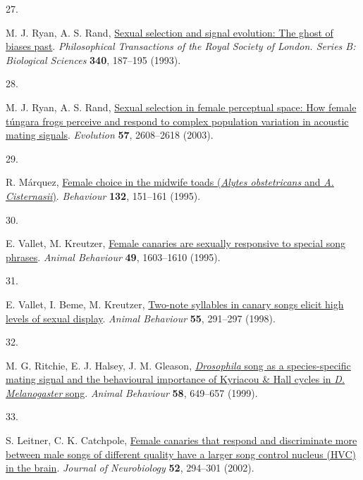 \documentclass[
]{article}
\newlength{\cslhangindent}
\newlength{\csllabelwidth}
\newenvironment{CSLReferences}[2] %
 {\begin{list}{}{%
  \setlength{\itemindent}{0pt}
  \setlength{\leftmargin}{0pt}
  \setlength{\parsep}{0pt}
  \ifodd #1
   \setlength{\leftmargin}{\cslhangindent}
   \setlength{\itemindent}{-1\cslhangindent}
  \fi
  \setlength{\itemsep}{#2\baselineskip}}}
 {\end{list}}
\newcommand{\CSLLeftMargin}[1]{\parbox[t]{\csllabelwidth}{\strut#1\strut}}
\newcommand{\CSLRightInline}[1]{\parbox[t]{\linewidth - \csllabelwidth}{\strut#1\strut}}
\begin{document}
\begin{CSLReferences}{0}{0}
\CSLLeftMargin{27. }%
\CSLRightInline{M. J. Ryan, A. S. Rand,
\href{https://doi.org/10.1098/rstb.1993.0057}{Sexual selection and
signal evolution: The ghost of biases past}. \emph{Philosophical
Transactions of the Royal Society of London. Series B: Biological
Sciences} \textbf{340}, 187--195 (1993).}

\CSLLeftMargin{28. }%
\CSLRightInline{M. J. Ryan, A. S. Rand,
\href{https://doi.org/10.1111/j.0014-3820.2003.tb01503.x}{Sexual
selection in female perceptual space: {How} female túngara frogs
perceive and respond to complex population variation in acoustic mating
signals}. \emph{Evolution} \textbf{57}, 2608--2618 (2003).}

\CSLLeftMargin{29. }%
\CSLRightInline{R. Márquez,
\href{https://doi.org/10.1163/156853995X00342}{Female choice in the
midwife toads (\emph{{Alytes} obstetricans} and \emph{{A}.
Cisternasii})}. \emph{Behaviour} \textbf{132}, 151--161 (1995).}

\CSLLeftMargin{30. }%
\CSLRightInline{E. Vallet, M. Kreutzer,
\href{https://doi.org/10.1016/0003-3472(95)90082-9}{Female canaries are
sexually responsive to special song phrases}. \emph{Animal Behaviour}
\textbf{49}, 1603--1610 (1995).}

\CSLLeftMargin{31. }%
\CSLRightInline{E. Vallet, I. Beme, M. Kreutzer,
\href{https://doi.org/10.1006/anbe.1997.0631}{Two-note syllables in
canary songs elicit high levels of sexual display}. \emph{Animal
Behaviour} \textbf{55}, 291--297 (1998).}

\CSLLeftMargin{32. }%
\CSLRightInline{M. G. Ritchie, E. J. Halsey, J. M. Gleason,
\href{https://doi.org/10.1006/anbe.1999.1167}{\emph{Drosophila} song as
a species-specific mating signal and the behavioural importance of
{Kyriacou} \& {Hall} cycles in \emph{{D}. Melanogaster} song}.
\emph{Animal Behaviour} \textbf{58}, 649--657 (1999).}

\CSLLeftMargin{33. }%
\CSLRightInline{S. Leitner, C. K. Catchpole,
\href{https://doi.org/10.1002/neu.10085}{Female canaries that respond
and discriminate more between male songs of different quality have a
larger song control nucleus ({HVC}) in the brain}. \emph{Journal of
Neurobiology} \textbf{52}, 294--301 (2002).}


\end{CSLReferences}
\end{document}
